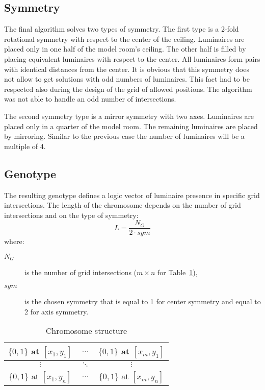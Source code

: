 \subsection{Symmetry}
The final algorithm solves two types of symmetry. The first type is a 2-fold rotational symmetry with respect to the center of the ceiling. Luminaires are placed only in one half of the model room's ceiling. The other half is filled by placing equivalent luminaires with respect to the center. All luminaires form pairs with identical distances from the center. It is obvious that this symmetry does not allow to get solutions with odd numbers of luminaires. This fact had to be respected also during the design of the grid of allowed positions. The algorithm was not able to handle an odd number of intersections.

The second symmetry type is a mirror symmetry with two axes. Luminaires are placed only in a quarter of the model room. The remaining luminaires are placed by mirroring. Similar to the previous case the number of luminaires will be a multiple of 4.

\subsection{Genotype}
The resulting genotype defines a logic vector of luminaire presence in specific grid intersections. The length of the chromosome depends on the number of grid intersections and on the type of symmetry:
\begin{equation}
\label{eq:chromLength}
L = \frac{N_G}{2\cdot sym}
\end{equation}
where:
\begin{description}
	\item[$N_G$] is the number of grid intersections ($m\times n$ for Table~\ref{tab:strucgenotype}),
	\item[$sym$] is the chosen symmetry that is equal to 1 for center symmetry and equal to 2 for axis symmetry.
\end{description}

\begin{table}[htb]
	\renewcommand{\arraystretch}{1.3}
	\caption{Chromosome structure}
 	\label{tab:strucgenotype}
	\centering
  \begin{tabular}{| c | c | c |}
    \hline
    $\lbrace0,1\rbrace$ at $[x_1,y_1]$ & $\ldots$ & $\lbrace0,1\rbrace$ at $[x_m,y_1]$ \\
    \hline
    $\vdots$ & $\ddots$ & $\vdots$ \\
    \hline
    $\lbrace0,1\rbrace$ at $[x_1,y_n]$ & $\ldots$ & $\lbrace0,1\rbrace$ at $[x_m,y_n]$ \\
    \hline
  \end{tabular}
\end{table}

